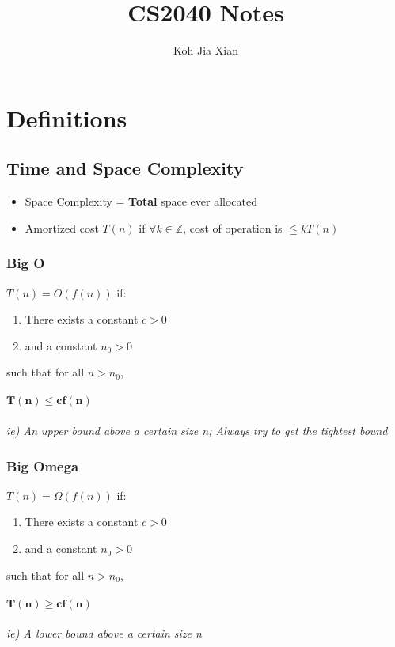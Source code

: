 \documentclass{article}
\title{CS2040 Notes}
\author{Koh Jia Xian}
\begin{document}
    \maketitle
    \tableofcontents

    \pagebreak

    \section{Definitions}

    \subsection{Time and Space Complexity}

    \begin{itemize}
        \item Space Complexity = \textbf{Total} space ever allocated
        \item Amortized cost $T(n)$ if $\forall k \in \mathbb{Z}$, cost of operation is $\leqq kT(n)$
    \end{itemize}

    \subsubsection{Big O}

    $T(n) = O(f(n))$ if:
    \begin{enumerate}
        \item There exists a constant $c > 0$
        \item and a constant $n_{0} > 0$
    \end{enumerate}
    such that for all $n > n_{0}$, \\\\$\bm{T(n) \leq c f(n)}$\\\\
    \emph{ie) An upper bound above a certain size n; Always try to get the tightest bound}

    \subsubsection{Big Omega}

    $T(n) = \Omega(f(n))$ if:
    \begin{enumerate}
        \item There exists a constant $c > 0$
        \item and a constant $n_{0} > 0$
    \end{enumerate}
    such that for all $n > n_{0}$, \\\\$\bm{T(n) \geq c f(n)}$\\\\
    \emph{ie) A lower bound above a certain size n}
\end{document}
